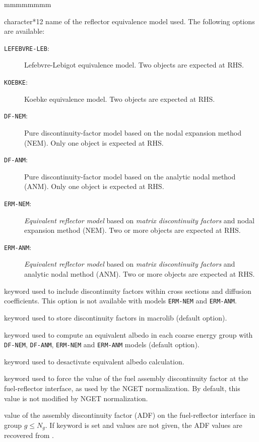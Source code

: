 \begin{ListeDeDescription}{mmmmmmmm}
\item[\dusa{hmod}] character*12 name of the reflector equivalence model used. The following options are available:
\begin{description}
\item[{\tt LEFEBVRE-LEB}:] Lefebvre-Lebigot equivalence model. Two  objects are expected at RHS.\cite{LLB,Frohlicher}
\item[{\tt KOEBKE}:] Koebke equivalence model. Two  objects are expected at RHS.\cite{Koebke,Frohlicher}
\item[{\tt DF-NEM}:] Pure discontinuity-factor model based on the nodal expansion method (NEM). Only one  object is expected at RHS.
\item[{\tt DF-ANM}:] Pure discontinuity-factor model based on the analytic nodal method (ANM). Only one  object is expected at RHS.
\item[{\tt ERM-NEM}:] {\sl Equivalent reflector model} based on {\sl matrix discontinuity factors} and nodal expansion method (NEM).
Two or more  objects are expected at RHS.
\item[{\tt ERM-ANM}:] {\sl Equivalent reflector model} based on {\sl matrix discontinuity factors} and analytic nodal method (ANM).
Two or more  objects are expected at RHS.
\end{description}

\item[\moc{SPH}] keyword used to include discontinuity factors within cross sections and diffusion coefficients. This option is not available
with models {\tt ERM-NEM} and {\tt ERM-ANM}.

\item[\moc{NOSP}] keyword used to store discontinuity factors in {\sc macrolib}  (default option).

\item[\moc{ALBE}] keyword used to compute an equivalent albedo in each coarse energy group with {\tt DF-NEM}, {\tt DF-ANM}, {\tt ERM-NEM} and {\tt ERM-ANM} models (default option).

\item[\moc{NOAL}] keyword used to desactivate equivalent albedo calculation.

\item[\moc{NGET}] keyword used to force the value of the fuel assembly discontinuity factor at the fuel-reflector interface, as used
by the NGET normalization. By default, this value is not modified by NGET normalization.

\item[\dusa{adf}] value of the assembly discontinuity factor (ADF) on the fuel-reflector interface in group $g\le N_g$. If keyword  is set and
 values are not given, the ADF values are recovered from .

\end{ListeDeDescription}

\eject
